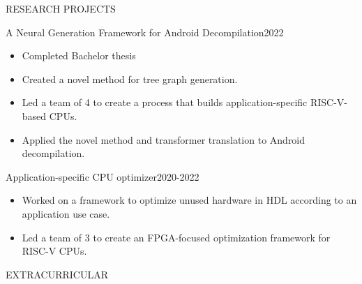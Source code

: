 \documentclass{resume}
\begin{document}
\begin{minipage}[t]{0.49\textwidth}

\begin{rsection}{\MakeUppercase{Research Projects}}{}

		\begin{rcontent}{A Neural Generation Framework for Android Decompilation}{2022}{}{}
			\begin{itemize}
				\item Completed Bachelor thesis
				\item Created a novel method for tree graph generation.
				\item Led a team of 4 to create a process that builds application-specific RISC-V-based CPUs.
				\item Applied the novel method and transformer translation to Android decompilation.
			\end{itemize}
		\end{rcontent}
		\divider
		        \begin{rcontent}{Application-specific CPU optimizer}{2020-2022}{}{}
			\begin{itemize}
				\item Worked on a framework to optimize unused hardware in HDL according to an application use case.
				                \item Led a team of 3 to create an FPGA-focused optimization framework for RISC-V CPUs.
			\end{itemize}
		\end{rcontent}

	\end{rsection}

	\begin{rsection}{\MakeUppercase{extracurricular}}{}


\end{rsection}
\end{minipage}
\end{document}
